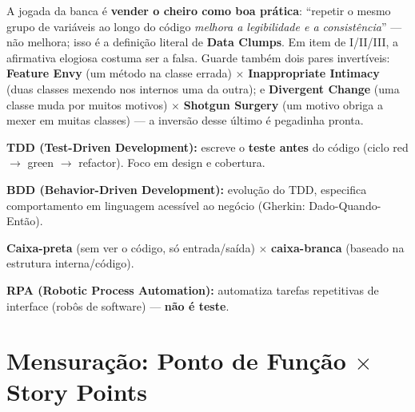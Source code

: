 \begin{pegadinha}
A jogada da banca é \textbf{vender o cheiro como boa prática}: ``repetir o
mesmo grupo de variáveis ao longo do código \emph{melhora a legibilidade e a
consistência}'' --- não melhora; isso é a definição literal de \textbf{Data
Clumps}. Em item de I/II/III, a afirmativa elogiosa costuma ser a falsa.
Guarde também dois pares invertíveis: \textbf{Feature Envy} (um método na
classe errada) $\times$ \textbf{Inappropriate Intimacy} (duas classes mexendo
nos internos uma da outra); e \textbf{Divergent Change} (uma classe muda por
muitos motivos) $\times$ \textbf{Shotgun Surgery} (um motivo obriga a mexer
em muitas classes) --- a inversão desse último é pegadinha pronta.
\end{pegadinha}

\begin{conceito}
\textbf{TDD (Test-Driven Development):} escreve o \textbf{teste antes} do
código (ciclo red $\to$ green $\to$ refactor). Foco em design e cobertura.

\textbf{BDD (Behavior-Driven Development):} evolução do TDD, especifica
comportamento em linguagem acessível ao negócio (Gherkin: Dado-Quando-Então).

\textbf{Caixa-preta} (sem ver o código, só entrada/saída) $\times$
\textbf{caixa-branca} (baseado na estrutura interna/código).

\textbf{RPA (Robotic Process Automation):} automatiza tarefas repetitivas de
interface (robôs de software) --- \textbf{não é teste}.
\end{conceito}

\section{Mensuração: Ponto de Função $\times$ Story Points}

